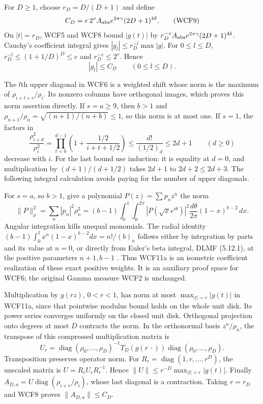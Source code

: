For $D\ge1$, choose $r_D=D/(D+1)$ and define
\[
 C_D=e\,2^v A_{\rm abs}e^{2\pi\gamma}(2D+1)^{4\delta}.
 \tag{WCF9}
\]
On $|t|=r_D$, WCF5 and WCF8 bound $|g(t)|$ by
$r_D^{-v}A_{\rm abs}e^{2\pi\gamma}(2D+1)^{4\delta}$.
Cauchy's coefficient integral gives $|g_l|\le r_D^{-l}\max|g|$.
For $0\le l\le D$, $r_D^{-l}\le(1+1/D)^D\le e$ and
$r_D^{-v}\le2^v$. Hence
\[
 |g_l|\le C_D\qquad(0\le l\le D).
 \tag{WCF10}
\]

The $l$th upper diagonal in WCF6 is a weighted shift whose norm is
the maximum of $\rho_{i+l+v}/\rho_i$. Its nonzero columns have
orthogonal images, which proves this norm assertion directly. If
$s=a\ge9$, then $b>1$ and $\rho_{n+1}/\rho_n=
\sqrt{(n+1)/(n+b)}\le1$, so this norm is at most one.
If $s=1$, the factors in
\[
 \frac{\rho_{i+d}^2}{\rho_i^2}
 =\prod_{t=0}^{d-1}\left(1+\frac{1/2}{i+t+1/2}\right)
 \le\frac{d!}{(1/2)_d}\le2d+1
 \qquad(d\ge0)
 \tag{WCF11}
\]
decrease with $i$. For the last bound use induction: it is equality
at $d=0$, and multiplication by $(d+1)/(d+1/2)$ takes $2d+1$
to $2d+2\le2d+3$. The following integral calculation avoids paying
for the number of upper diagonals.

For $s=a$, so $b>1$, give a polynomial $P(z)=\sum p_nz^n$ the norm
\[
 \|P\|_{\rho}^2=\sum_n|p_n|^2\rho_n^2
  =(b-1)\int_0^1\int_0^{2\pi}|P(\sqrt{x}e^{i\theta})|^2
       \frac{d\theta}{2\pi}(1-x)^{b-2}\,dx.
 \tag{WCF11a}
\]
Angular integration kills unequal monomials. The radial identity
$(b-1)\int_0^1x^n(1-x)^{b-2}dx=n!/(b)_n$ follows either by
integration by parts and its value at $n=0$, or directly from Euler's
beta integral, DLMF (5.12.1), at the positive parameters $n+1,b-1$
\cite{human:dlmf5}. Thus WCF11a is an isometric coefficient
realization of these exact positive weights. It is an auxiliary proof
space for WCF6; the original Gamma measure WCF2 is unchanged.

Multiplication by $g(rz)$, $0<r<1$, has norm at most
$\max_{|t|=r}|g(t)|$ in WCF11a, since that pointwise modulus bound
holds on the whole unit disk. Its power series converges uniformly
on the closed unit disk. Orthogonal projection onto degrees at most
$D$ contracts the norm. In the orthonormal basis $z^n/\rho_n$, the
transpose of this compressed multiplication matrix is
\[
 U_r=\operatorname{diag}(\rho_0,\ldots,\rho_D)^{-1}
            T_D(g(r\,\cdot))\operatorname{diag}(\rho_0,\ldots,\rho_D).
 \tag{WCF11b}
\]
Transposition preserves operator norm. For
$R_r=\operatorname{diag}(1,r,\ldots,r^D)$, the unscaled matrix is
$U=R_rU_rR_r^{-1}$. Hence
$\|U\|\le r^{-D}\max_{|t|=r}|g(t)|$. Finally
$A_{D,a}=U\operatorname{diag}(\rho_{i+v}/\rho_i)$, whose last
diagonal is a contraction. Taking $r=r_D$ and WCF8 proves
$\|A_{D,a}\|\le C_D$.

